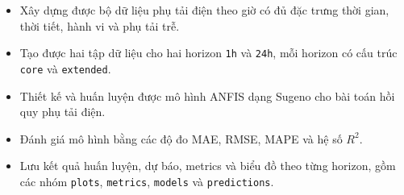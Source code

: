 \begin{itemize}[leftmargin=1.2cm]
  \item Xây dựng được bộ dữ liệu phụ tải điện theo giờ có đủ đặc trưng thời gian, thời tiết, hành vi và phụ tải trễ.
  \item Tạo được hai tập dữ liệu cho hai horizon \texttt{1h} và \texttt{24h}, mỗi horizon có cấu trúc \texttt{core} và \texttt{extended}.
  \item Thiết kế và huấn luyện được mô hình ANFIS dạng Sugeno cho bài toán hồi quy phụ tải điện.
  \item Đánh giá mô hình bằng các độ đo MAE, RMSE, MAPE và hệ số $R^2$.
  \item Lưu kết quả huấn luyện, dự báo, metrics và biểu đồ theo từng horizon, gồm các nhóm \texttt{plots}, \texttt{metrics}, \texttt{models} và \texttt{predictions}.
\end{itemize}
